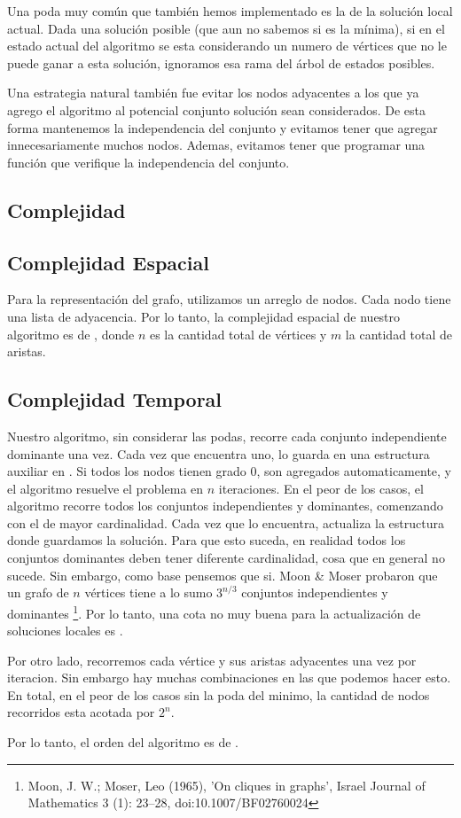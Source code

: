 Una poda muy común que también hemos implementado es la de la solución local actual. Dada una solución posible (que aun no sabemos si es la mínima), si en el estado actual del algoritmo se esta considerando un numero de vértices que no le puede ganar a esta solución, ignoramos esa rama del árbol de estados posibles.

Una estrategia natural también fue evitar los nodos adyacentes a los que ya agrego el algoritmo al potencial conjunto solución sean considerados. De esta forma mantenemos la independencia del conjunto y evitamos tener que agregar innecesariamente muchos nodos. Ademas, evitamos tener que programar una función que verifique la independencia del conjunto.

\subsection{Complejidad}

\subsection{Complejidad Espacial}
Para la representación del grafo, utilizamos un arreglo de nodos. Cada nodo tiene una lista de adyacencia. Por lo tanto, la complejidad espacial de nuestro algoritmo es de , donde $n$ es la cantidad total de vértices y $m$ la cantidad total de aristas.

\subsection{Complejidad Temporal}
Nuestro algoritmo, sin considerar las podas, recorre cada conjunto independiente dominante una vez. Cada vez que encuentra uno, lo guarda en una estructura auxiliar en . Si todos los nodos tienen grado 0, son agregados automaticamente, y el algoritmo resuelve el problema en $n$ iteraciones.
En el peor de los casos, el algoritmo recorre todos los conjuntos independientes y dominantes, comenzando con el de mayor cardinalidad. Cada vez que lo encuentra, actualiza la estructura donde guardamos la solución. Para que esto suceda, en realidad todos los conjuntos dominantes deben tener diferente cardinalidad, cosa que en general no sucede. Sin embargo, como base pensemos que si. Moon \& Moser probaron que un grafo de $n$ vértices tiene a lo sumo $3^{n/3}$ conjuntos independientes y dominantes 
\footnote{Moon, J. W.; Moser, Leo (1965), 'On cliques in graphs', Israel Journal of Mathematics 3 (1): 23–28, doi:10.1007/BF02760024}. Por lo tanto, una cota no muy buena para la actualización de soluciones locales es .

Por otro lado, recorremos cada vértice y sus aristas adyacentes una vez por iteracion. Sin embargo hay muchas combinaciones en las que podemos hacer esto. En total, en el peor de los casos sin la poda del minimo, la cantidad de nodos recorridos esta acotada por $2^n$.

Por lo tanto, el orden del algoritmo es de .